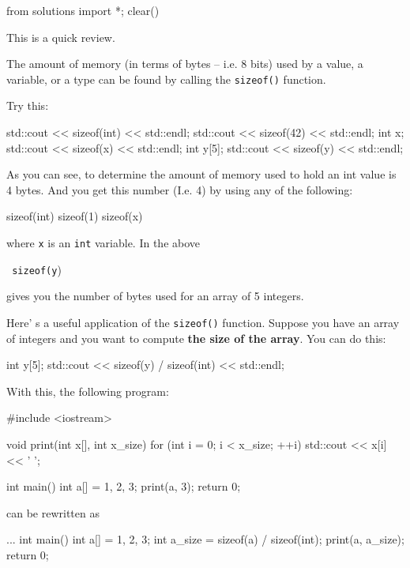 \begin{python0}
from solutions import *; clear()
\end{python0}

This is a quick review.

The amount of memory (in terms of bytes -- i.e. 8 bits) used by a value,
a variable, or a type can be found by calling the \texttt{sizeof()}
function.

Try this:

\begin{consolethree}[escapeinside=||]
std::cout << sizeof(int) << std::endl;
std::cout << sizeof(42) << std::endl;
int x;
std::cout << sizeof(x) << std::endl;
int y[5];
std::cout << sizeof(y) << std::endl;
\end{consolethree}

As you can see, to determine the amount of memory used to hold an int
value is 4 bytes. And you get this number (I.e. 4) by using any of the
following:

sizeof(int) sizeof(1) sizeof(x)

where \texttt{x} is an \texttt{int} variable. In the above

\texttt{ sizeof(y})

gives you the number of bytes used for an array of 5 integers.

Here' s a useful application of the \texttt{sizeof()}
function. Suppose you have an array of integers and you want to compute
\textbf{the size of the array}. You can do this:

\begin{consolethree}[escapeinside=||]
int y[5];
std::cout << sizeof(y) / sizeof(int) << std::endl;
\end{consolethree}

With this, the following program:

\begin{consolethree}[escapeinside=||]
\#include \textless iostream>

void print(int x[], int x_size)
{
    for (int i = 0; i < x_size; ++i)
    {
        std::cout << x[i] << ' ';
    }
}

int main()
{
    int a[] = {1, 2, 3};
    print(a, 3);
    return 0;
}
\end{consolethree}

can be rewritten as

\begin{consolethree}[escapeinside=||]
...
int main()
{
    int a[] = {1, 2, 3};
    int a_size = sizeof(a) / sizeof(int);
    print(a, a_size);
    return 0;
}
\end{consolethree}

